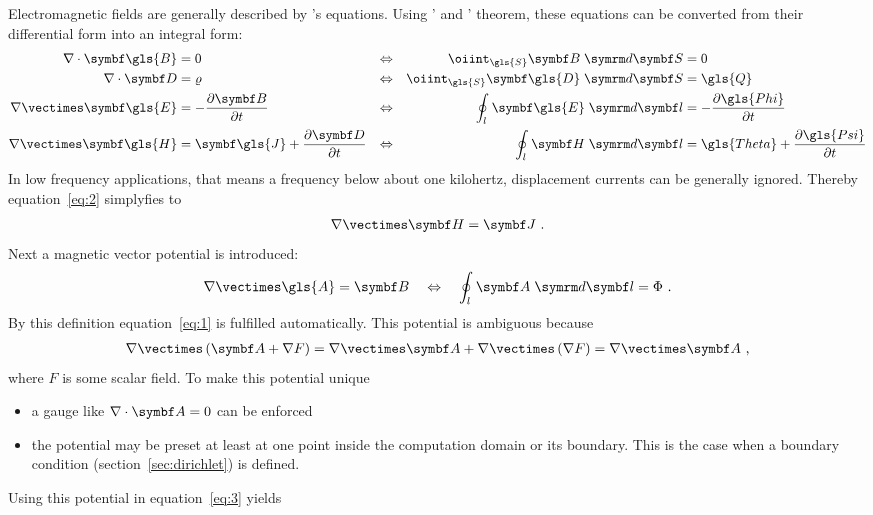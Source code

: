 Electromagnetic fields are generally described by
's equations.  Using ' and
' theorem, these equations can be converted from
their differential form into an integral form:
\begin{align}
  \label{eq:1}
  \nabla\cdot\vect{\gls{B}}&=0 &\Leftrightarrow&&
  \oiinteg{\gls{S}}{\vect{B}}{\vect{S}}&=0 \\
  \nabla\cdot\vect{D}&=\varrho &\Leftrightarrow&&
  \oiinteg{\gls{S}}{\vect{\gls{D}}}{\vect{S}}&=\gls{Q} \\
  \label{eq:7}
  \nabla\vectimes\vect{\gls{E}}&=-\partdiff{\vect{B}}{t} &\Leftrightarrow&&
  \ointeg{l}{\vect{\gls{E}}}{\vect{l}}&=-\partdiff{\gls{Phi}}{t} \\
  \label{eq:2}
  \nabla\vectimes\vect{\gls{H}}&=\vect{\gls{J}}+\partdiff{\vect{D}}{t}
  &\Leftrightarrow&&
  \ointeg{l}{\vect{H}}{\vect{l}}&= \gls{Theta} + \partdiff{\gls{Psi}}{t}
\end{align}
In low frequency applications, that means a frequency below about one
kilohertz, displacement currents can be generally ignored.  There\-by
equation~\eqref{eq:2} simplyfies to
\begin{gather}
  \label{eq:3}
  \nabla\vectimes\vect{H}=\vect{J}\text{~.}
\end{gather}
Next a magnetic vector potential is introduced:
\begin{gather}
  \label{eq:4}
  \nabla\vectimes\gls{A}=\vect{B}\quad\Leftrightarrow\quad
  \ointeg{l}{\vect{A}}{\vect{l}}=\Phi\text{~.}
\end{gather}
By this definition equation~\eqref{eq:1} is fulfilled automatically.
This potential is ambiguous because
\begin{gather}
  \label{eq:8}
  \nabla\vectimes\left(\vect{A}+\nabla F\right)
  =\nabla\vectimes\vect{A}+\nabla\vectimes\left(\nabla F\right)
  =\nabla\vectimes\vect{A}\text{~,}
\end{gather}
where $F$ is some scalar field.
To make this potential unique
\begin{itemize}
\item a gauge like $\nabla\cdot\vect{A}=0$ can be enforced
\item the potential may be preset at least at one point inside the
  computation domain or its boundary.  This is the case when a
   boundary condition
  (section~\ref{sec:dirichlet}) is defined.
\end{itemize}
Using this potential in equation~\eqref{eq:3} yields
